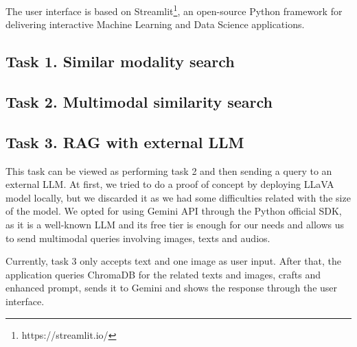\documentclass[12pt]{article}
\begin{document}
The user interface is based on Streamlit\footnote{https://streamlit.io/}, an open-source Python framework for delivering interactive Machine Learning and Data Science applications. 

\subsection{Task 1. Similar modality search}
\subsection{Task 2. Multimodal similarity search}
\subsection{Task 3. RAG with external LLM}
This task can be viewed as performing task 2 and then sending a query to an external LLM. At first, we tried to do a proof of concept by deploying LLaVA model locally, but we discarded it as we had some difficulties related with the size of the model. We opted for using Gemini API through the Python official SDK, as it is a well-known LLM and its free tier is enough for our needs and allows us to send multimodal queries involving images, texts and audios.

Currently, task 3 only accepts text and one image as user input. After that, the application queries ChromaDB for the related texts and images, crafts and enhanced prompt, sends it to Gemini and shows the response through the user interface.
\end{document}

